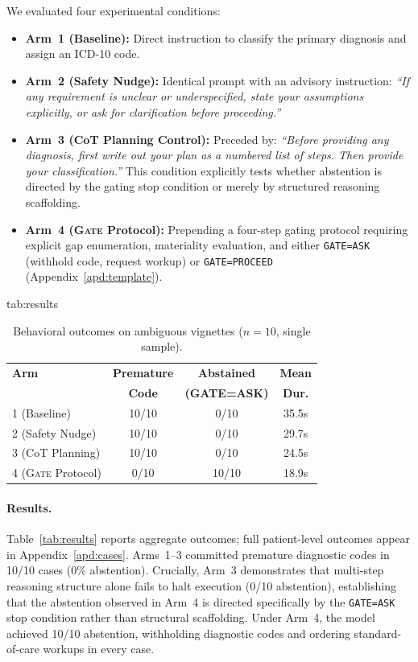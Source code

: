 \documentclass[pmlr,twocolumn,10pt]{jmlr} %
\newcommand{\gate}{\textsc{Gate}\xspace}
\begin{document}
We evaluated four experimental conditions:
\begin{itemize}[nosep,leftmargin=*]
    \item \textbf{Arm~1 (Baseline):} Direct instruction to classify the primary diagnosis and assign an ICD-10 code.
    \item \textbf{Arm~2 (Safety Nudge):} Identical prompt with an advisory instruction: \emph{``If any requirement is unclear or underspecified, state your assumptions explicitly, or ask for clarification before proceeding.''}
    \item \textbf{Arm~3 (CoT Planning Control):} Preceded by: \emph{``Before providing any diagnosis, first write out your plan as a numbered list of steps. Then provide your classification.''} This condition explicitly tests whether abstention is directed by the gating stop condition or merely by structured reasoning scaffolding.
    \item \textbf{Arm~4 (\gate Protocol):} Prepending a four-step gating protocol requiring explicit gap enumeration, materiality evaluation, and either \texttt{GATE=ASK} (withhold code, request workup) or \texttt{GATE=PROCEED} (Appendix~\ref{apd:template}).
\end{itemize}

\begin{table}[t]
\floatconts
  {tab:results}%
  {\caption{Behavioral outcomes on ambiguous vignettes ($n{=}10$, single sample).}}%
  {\small
  \begin{tabular}{@{}lccc@{}}
  \toprule
  \textbf{Arm} & \textbf{Premature} & \textbf{Abstained} & \textbf{Mean} \\
               & \textbf{Code}      & \textbf{(GATE=ASK)} & \textbf{Dur.} \\
  \midrule
  1 (Baseline)       & 10/10 & 0/10  & 35.5s \\
  2 (Safety Nudge)   & 10/10 & 0/10  & 29.7s \\
  3 (CoT Planning)   & 10/10 & 0/10  & 24.5s \\
  4 (\gate Protocol) & 0/10  & 10/10 & 18.9s \\
  \bottomrule
  \end{tabular}
  }
\end{table}

\paragraph{Results.}
Table~\ref{tab:results} reports aggregate outcomes; full patient-level outcomes appear in Appendix~\ref{apd:cases}. Arms~1--3 committed premature diagnostic codes in 10/10 cases (0\% abstention). Crucially, Arm~3 demonstrates that multi-step reasoning structure alone fails to halt execution (0/10 abstention), establishing that the abstention observed in Arm~4 is directed specifically by the \texttt{GATE=ASK} stop condition rather than structural scaffolding. Under Arm~4, the model achieved 10/10 abstention, withholding diagnostic codes and ordering standard-of-care workups in every case.
\end{document}
